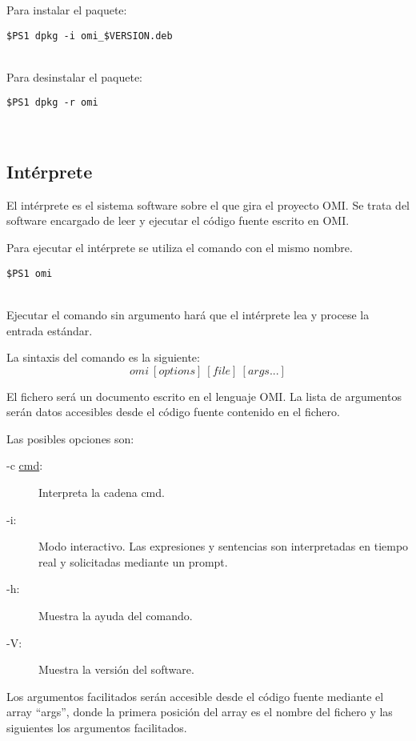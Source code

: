 Para instalar el paquete:\\
\begin{lstlisting}
$PS1 dpkg -i omi_$VERSION.deb
\end{lstlisting}
\hfill\\

Para desinstalar el paquete:\\
\begin{lstlisting}
$PS1 dpkg -r omi
\end{lstlisting}
\hfill\\

\subsection{Intérprete}
El intérprete es el sistema software sobre el que gira el proyecto OMI. Se trata
del software encargado de leer y ejecutar el código fuente escrito en OMI.

Para ejecutar el intérprete se utiliza el comando con el mismo nombre.\\
 \begin{lstlisting}
$PS1 omi
\end{lstlisting}
\hfill\\

Ejecutar el comando sin argumento hará que el intérprete lea y procese la entrada estándar.

La sintaxis del comando es la siguiente:
$$
omi\ [options]\ [file]\ [args...]
$$

El fichero será un documento escrito en el lenguaje OMI. La lista de argumentos serán datos accesibles
desde el código fuente contenido en el fichero.

Las posibles opciones son:
\begin{description} 
\item [-c \underline{cmd}:] Interpreta la cadena cmd.
\item [-i:] Modo interactivo. Las expresiones y sentencias son interpretadas en tiempo real y solicitadas mediante un prompt.
\item [-h:] Muestra la ayuda del comando.
\item [-V:] Muestra la versión del software.
\end{description}

Los argumentos facilitados serán accesible desde el código fuente mediante el array ``args'', donde la primera posición del array es
el nombre del fichero y las siguientes los argumentos facilitados.

